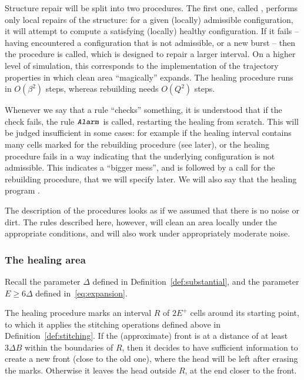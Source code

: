 \documentclass[12pt]{memoir}
\newcommand{\authnote}[3]
{\text{{ \textcolor{#3}{\( \langle\hspace{-0.2em}\langle \)\textsf{\footnotesize #1: #2}\( \rangle\hspace{-0.2em}\rangle \)}}}}
\newcommand{\authnote}[2]{}
\newcommand{\Pnote}[1]{{\authnote{P}{#1}{cyan}}}
\renewcommand{\ge}{\geq}
\newcommand{\rul}[1]{\ensuremath{\texttt{\slshape #1\/}}}
\def\B{B}
\newcommand{\E}{E}
\newcommand{\R}{R}
\newcommand{\Alarm}{\rul{Alarm}}
\begin{document}
Structure repair will be split into two procedures.
The first one, called , performs
only local repairs of the structure: for a given (locally) admissible configuration,
it will attempt to compute a satisfying (locally) healthy configuration.
If it fails -- having encountered a configuration that is not admissible, or
a new burst -- then the  procedure is called, which is designed
to repair a larger interval.
On a higher level of simulation, 
this corresponds to the implementation of the trajectory properties
in which clean area ``magically'' expands.
The healing procedure runs in \( O(\beta^{2}) \) 
steps, whereas rebuilding needs \( O(Q^{2}) \) steps. \Pnote{maybe even \( Q^{3} \)?}

Whenever we say that a rule ``checks'' something,
it is understood that if the check fails, the rule \( \Alarm \) is called, restarting the 
healing from scratch.
This will be judged insufficient in some cases: for example if 
the healing interval contains many cells marked for the rebuilding procedure (see later),
or the healing procedure fails in a way
indicating that the underlying configuration is not admissible.
This indicates a ``bigger mess'', and is followed by a call for
the rebuilding procedure, that we will specify later.
We will also say that the healing program .

The description of the procedures looks as if we assumed that there is no noise or dirt.
The rules described here, however, will clean an area locally under the 
appropriate conditions, and will also work under appropriately moderate noise.

\subsubsection{The healing area}

Recall the parameter \( \Delta \) defined in Definition~\ref{def:substantial},
and the parameter \( \E\ge 6\Delta \) defined in~\eqref{eq:expansion}. %

The healing procedure 
marks an interval \( \R \) of \( 2\E^{+} \) cells around its starting point, to which it applies the
stitching operations defined above in Definition~\ref{def:stitching}.
If the (approximate) front is at a distance of at least \( 3\Delta\B \) within the boundaries
of \( \R \), then it decides to have sufficient information to create a 
new front (close to the old one), where the head will be left after erasing the marks.
Otherwise it leaves the head outside \( \R \), at the end closer to the front.
\end{document}
